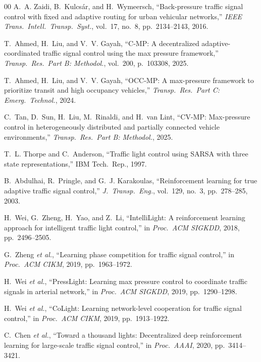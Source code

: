 \documentclass[journal]{IEEEtran}
\begin{document}
\begin{thebibliography}{00}
A.~A. Zaidi, B.~Kulcs\'ar, and H.~Wymeersch, ``Back-pressure traffic
signal control with fixed and adaptive routing for urban vehicular
networks,'' \textit{IEEE Trans.\ Intell.\ Transp.\ Syst.}, vol.~17,
no.~8, pp.~2134--2143, 2016.

T.~Ahmed, H.~Liu, and V.~V. Gayah, ``C-MP: A decentralized
adaptive-coordinated traffic signal control using the max pressure
framework,'' \textit{Transp.\ Res.\ Part B: Methodol.}, vol.~200,
p.~103308, 2025.

T.~Ahmed, H.~Liu, and V.~V. Gayah, ``OCC-MP: A max-pressure framework to
prioritize transit and high occupancy vehicles,'' \textit{Transp.\ Res.\
Part C: Emerg.\ Technol.}, 2024.

C.~Tan, D.~Sun, H.~Liu, M.~Rinaldi, and H.~van Lint, ``CV-MP:
Max-pressure control in heterogeneously distributed and partially
connected vehicle environments,'' \textit{Transp.\ Res.\ Part B:
Methodol.}, 2025.

T.~L. Thorpe and C.~Anderson, ``Traffic light control using SARSA with
three state representations,'' IBM Tech.\ Rep., 1997.

B.~Abdulhai, R.~Pringle, and G.~J. Karakoulas, ``Reinforcement learning
for true adaptive traffic signal control,'' \textit{J.\ Transp.\ Eng.},
vol.~129, no.~3, pp.~278--285, 2003.

H.~Wei, G.~Zheng, H.~Yao, and Z.~Li, ``IntelliLight: A reinforcement
learning approach for intelligent traffic light control,'' in
\textit{Proc.\ ACM SIGKDD}, 2018, pp.~2496--2505.

G.~Zheng \textit{et al.}, ``Learning phase competition for traffic signal
control,'' in \textit{Proc.\ ACM CIKM}, 2019, pp.~1963--1972.

H.~Wei \textit{et al.}, ``PressLight: Learning max pressure control to
coordinate traffic signals in arterial network,'' in \textit{Proc.\ ACM
SIGKDD}, 2019, pp.~1290--1298.

H.~Wei \textit{et al.}, ``CoLight: Learning network-level cooperation for
traffic signal control,'' in \textit{Proc.\ ACM CIKM}, 2019,
pp.~1913--1922.

C.~Chen \textit{et al.}, ``Toward a thousand lights: Decentralized deep
reinforcement learning for large-scale traffic signal control,'' in
\textit{Proc.\ AAAI}, 2020, pp.~3414--3421.


\end{thebibliography}
\end{document}
